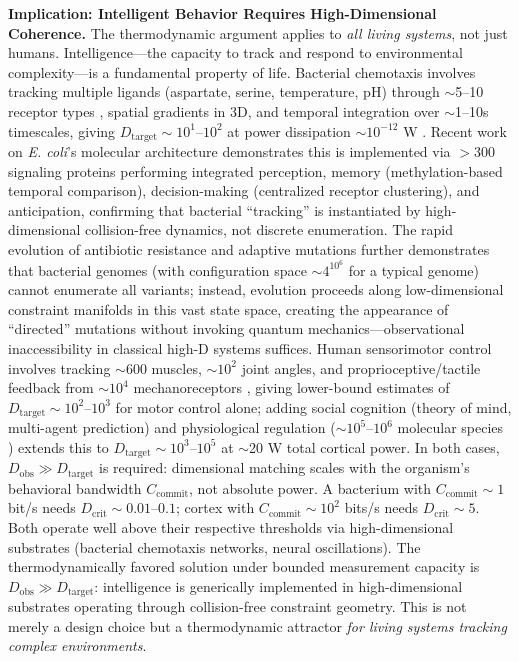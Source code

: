 \documentclass[12pt]{article}
\begin{document}
\textbf{Implication: Intelligent Behavior Requires High-Dimensional Coherence.} The thermodynamic argument applies to \textit{all living systems}, not just humans. Intelligence—the capacity to track and respond to environmental complexity—is a fundamental property of life. Bacterial chemotaxis \cite{berg1972,sourjik2004} involves tracking multiple ligands (aspartate, serine, temperature, pH) through $\sim$5--10 receptor types \cite{wadhams2004}, spatial gradients in 3D, and temporal integration over $\sim$1--10s timescales, giving $D_{\text{target}} \sim 10^1$--$10^2$ at power dissipation $\sim 10^{-12}$ W \cite{frank2024}. Recent work on \textit{E. coli}'s molecular architecture \cite{just2025} demonstrates this is implemented via $>$300 signaling proteins performing integrated perception, memory (methylation-based temporal comparison), decision-making (centralized receptor clustering), and anticipation, confirming that bacterial ``tracking'' is instantiated by high-dimensional collision-free dynamics, not discrete enumeration. The rapid evolution of antibiotic resistance and adaptive mutations \cite{melkikh2025} further demonstrates that bacterial genomes (with configuration space $\sim 4^{10^6}$ for a typical genome) cannot enumerate all variants; instead, evolution proceeds along low-dimensional constraint manifolds in this vast state space, creating the appearance of ``directed'' mutations without invoking quantum mechanics—observational inaccessibility in classical high-D systems suffices. Human sensorimotor control involves tracking $\sim$600 muscles, $\sim 10^2$ joint angles, and proprioceptive/tactile feedback from $\sim 10^4$ mechanoreceptors \cite{johansson1998}, giving lower-bound estimates of $D_{\text{target}} \sim 10^2$--$10^3$ for motor control alone; adding social cognition (theory of mind, multi-agent prediction) and physiological regulation ($\sim 10^5$--$10^6$ molecular species \cite{milo2010}) extends this to $D_{\text{target}} \sim 10^3$--$10^5$ at $\sim$20 W total cortical power. In both cases, $D_{\text{obs}} \gg D_{\text{target}}$ is required: dimensional matching scales with the organism's behavioral bandwidth $C_{\text{commit}}$, not absolute power. A bacterium with $C_{\text{commit}} \sim 1$ bit/s needs $D_{\text{crit}} \sim 0.01$--$0.1$; cortex with $C_{\text{commit}} \sim 10^2$ bits/s needs $D_{\text{crit}} \sim 5$. Both operate well above their respective thresholds via high-dimensional substrates (bacterial chemotaxis networks, neural oscillations). The thermodynamically favored solution under bounded measurement capacity is $D_{\text{obs}} \gg D_{\text{target}}$: intelligence is generically implemented in high-dimensional substrates operating through collision-free constraint geometry. This is not merely a design choice but a thermodynamic attractor \textit{for living systems tracking complex environments}.
\end{document}
